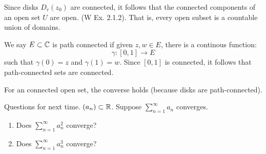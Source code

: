 \documentclass[12pt]{amsart}
\begin{document}
Since disks $D_r(z_0)$ are connected, it follows that the connected components of an open set $U$ are open. (W Ex. 2.1.2). That is, every open subset is a countable union of domains. 

We say $E \subset \mathbb C$ is path connected if given $z, w \in E$, there is a continous function: 
\[ \gamma: [0, 1] \to E \]
such that $\gamma(0) = z$ and $\gamma(1) = w$. Since $[0, 1]$ is connected, it follows that path-connected sets are connected. 

For an connected open set, the converse holds (because disks are path-connected). 

Questions for next time. 
$(a_n) \subset \mathbb R$. Suppose $\sum_{n=1}^\infty a_n$ converges. 
\begin{enumerate}
    \item[Q1.] Does $\sum_{n=1}^\infty a_n^2$ converge? 
    \item[Q2.] Does $\sum_{n=1}^\infty a_n^3$ converge? 
\end{enumerate}
\end{document}
